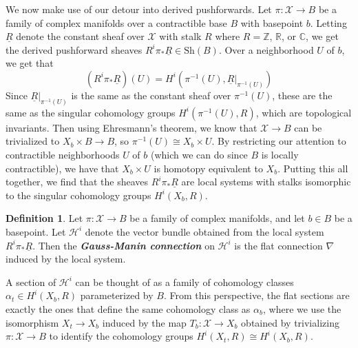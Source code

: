 \documentclass[psamsfonts, 12pt]{amsart}
\theoremstyle{definition}
\newtheorem{defn}[thm]{Definition}
\theoremstyle{remark}
\newcommand{\R}{\mathbb{R}}
\newcommand{\ib}[1]{\textbf{\textit{#1}}}
\newcommand{\Z}{\mathbb{Z}}
\newcommand{\C}{\mathbb{C}}
\newcommand{\inv}{^{-1}}
\begin{document}
We now make use of our detour into derived pushforwards. Let $\pi : \mathcal{X} \to B$
be a family of complex manifolds over a contractible base $B$ with basepoint $b$.
Letting $\underline{R}$ denote the constant sheaf over $\mathcal{X}$ with stalk
$R$ where $R = \Z$, $\R$, or $\C$, we get the derived pushforward
sheaves $R^i\pi_*\underline{R} \in \mathrm{Sh}(B)$. Over a neighborhood $U$ of $b$,
we get that
\[
(R^i\pi_*\underline{R})(U) = H^i(\pi\inv(U),\underline{R}\vert_{\pi\inv(U)})
\]
Since $\underline{R}\vert_{\pi\inv(U)}$ is the same as the constant sheaf
over $\pi\inv(U)$, these are the same as the singular cohomology groups
$H^i(\pi\inv(U),R)$, which are topological invariants.
Then using Ehresmann's theorem, we know that $\mathcal{X} \to B$ can be
trivialized to $X_b \times B \to B$, so $\pi\inv(U) \cong X_b \times U$.
By restricting our attention to contractible neighborhoods $U$ of $b$
(which we can do since $B$ is locally contractible), we have that
$X_b \times U$ is homotopy equivalent to $X_b$. Putting this all together, we
find that the sheaves $R^i\pi_*\underline{R}$ are local systems with
stalks isomorphic to the singular cohomology groups $H^i(X_b,R)$.
%
\begin{defn}
Let $\pi : \mathcal{X} \to B$ be a family of complex manifolds, and let $b \in B$
be a basepoint. Let $\mathcal{H}^i$ denote the vector bundle obtained from the local
system $R^i\pi_*\underline{R}$. Then the \ib{Gauss-Manin connection} on
$\mathcal{H}^i$ is the flat connection $\nabla$ induced by the local system.
\end{defn}
%
A section of $\mathcal{H}^i$ can be thought of as a family of cohomology classes
$\alpha_t \in H^i(X_b,R)$ parameterized by $B$. From this perspective, the flat
sections are exactly the ones that define the same cohomology class as $\alpha_b$,
where we use the isomorphism $X_t \to X_b$ induced by the map
$T_b : \mathcal{X} \to X_b$ obtained by trivializing $\pi : \mathcal{X} \to B$
to identify the cohomology groups $H^i(X_t,R) \cong H^i(X_b,R)$.
%
\end{document}
